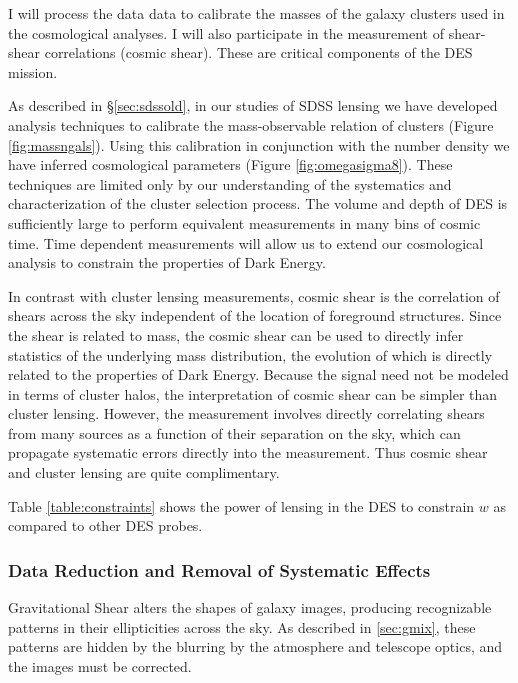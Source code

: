 \documentclass[12pt]{article}
\begin{document}
I will process the data data to calibrate the masses of the galaxy clusters
used in the cosmological analyses.  I will also participate in the measurement
of shear-shear correlations (cosmic shear).  These are critical components of
the DES mission.  


As described in \S\ref{sec:sdssold}, in our studies of SDSS lensing we have
developed analysis techniques to calibrate the mass-observable relation of
clusters (Figure \ref{fig:massngals}).  Using this calibration in conjunction
with the number density we have inferred cosmological parameters (Figure
\ref{fig:omegasigma8}).  These techniques are limited only by our understanding
of the systematics and characterization of the cluster selection process.  The
volume and depth of DES is sufficiently large to perform equivalent
measurements in many bins of cosmic time.  Time dependent measurements will
allow us to extend our cosmological analysis to constrain the properties of
Dark Energy.

In contrast with cluster lensing measurements, cosmic shear is the correlation
of shears across the sky independent of the location of foreground structures.
Since the shear is related to mass, the cosmic shear can be used to directly
infer statistics of the underlying mass distribution, the evolution of which is
directly related to the properties of Dark Energy.  Because the signal need not
be modeled in terms of cluster halos, the interpretation of cosmic shear can be
simpler than cluster lensing.  However, the measurement involves directly
correlating shears from many sources as a function of their separation on the
sky, which can propagate systematic errors directly into the measurement. Thus
cosmic shear and cluster lensing are quite complimentary.


Table \ref{table:constraints} shows the power of lensing in the DES to
constrain $w$ as compared to other DES probes.

\subsubsection{Data Reduction and Removal of Systematic Effects} 
\label{sec:des:process}

Gravitational Shear alters the shapes of galaxy images, producing recognizable
patterns in their ellipticities across the sky.  As described in \ref{sec:gmix},
these patterns are hidden by the blurring by the atmosphere and telescope
optics, and the images must be corrected.
\end{document}
